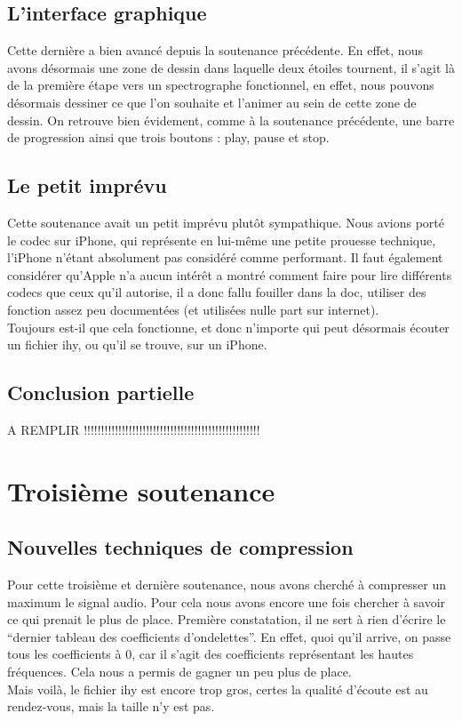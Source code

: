 \documentclass[a4paper,12pt]{report}
\begin{document}
\subsection{L'interface graphique}
Cette dernière a bien avancé depuis la soutenance précédente. En effet, nous
avons désormais une zone de dessin dans laquelle deux étoiles tournent, il
s'agit là de la première étape vers un spectrographe fonctionnel, en effet, nous
pouvons désormais dessiner ce que l'on souhaite et l'animer au sein de cette
zone de dessin. On retrouve bien évidement, comme à la soutenance précédente,
une barre de progression ainsi que trois boutons : play, pause et stop.
\subsection{Le petit imprévu}
Cette soutenance avait un petit imprévu plutôt sympathique. Nous avions porté le
codec sur iPhone, qui représente en lui-même une petite prouesse technique,
l'iPhone n'étant absolument pas considéré comme performant. Il faut également
considérer qu'Apple n'a aucun intérêt a montré comment faire pour lire
différents codecs que ceux qu'il autorise, il a donc fallu fouiller dans la doc,
utiliser des fonction assez peu documentées (et utilisées nulle part sur
internet).\\
Toujours est-il que cela fonctionne, et donc n'importe qui peut désormais
écouter un fichier ihy, ou qu'il se trouve, sur un iPhone.
\subsection{Conclusion partielle}
A REMPLIR !!!!!!!!!!!!!!!!!!!!!!!!!!!!!!!!!!!!!!!!!!!!!!!!!!!

\newpage

\section{Troisième soutenance}
\subsection{Nouvelles techniques de compression}
Pour cette troisième et dernière soutenance, nous avons cherché à compresser un
maximum le signal audio. Pour cela nous avons encore une fois chercher à savoir
ce qui prenait le plus de place. Première constatation, il ne sert à rien
d'écrire le ``dernier tableau des coefficients d'ondelettes''. En effet, quoi
qu'il arrive, on passe tous les coefficients à 0, car il s'agit des coefficients
représentant les hautes fréquences. Cela nous a permis de gagner un peu plus de
place.\\
Mais voilà, le fichier ihy est encore trop gros, certes la qualité d'écoute est
au rendez-vous, mais la taille n'y est pas.
\end{document}
